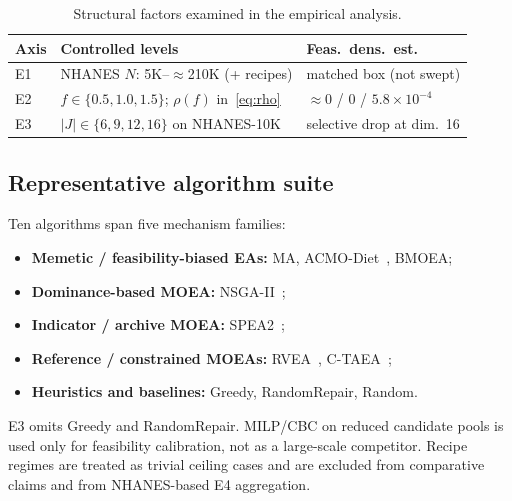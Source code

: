 \documentclass[lettersize,journal]{IEEEtran}
\begin{document}
\begin{table}[!t]
\centering
\caption{Structural factors examined in the empirical analysis.}
\label{tab:axes}
\scriptsize
\setlength{\tabcolsep}{2.5pt}
\begin{tabular}{@{}p{0.8cm}p{3.5cm}p{2.5cm}@{}}
\toprule
Axis & Controlled levels & Feas.\ dens.\ est. \\
\midrule
E1 & NHANES $N$: 5K--$\approx$210K (+ recipes) & matched box (not swept) \\
E2 & $f\in\{0.5,1.0,1.5\}$; $\rho(f)$ in~\eqref{eq:rho} & $\approx0$ / $0$ / $5.8{\times}10^{-4}$ \\
E3 & $|J|\in\{6,9,12,16\}$ on NHANES-10K & selective drop at dim.\ 16 \\
\bottomrule
\end{tabular}
\end{table}

\subsection{Representative algorithm suite}
Ten algorithms span five mechanism families:
\begin{itemize}
\item \textbf{Memetic / feasibility-biased EAs:} MA, ACMO-Diet~\cite{zhao2025acmodiet}, BMOEA;
\item \textbf{Dominance-based MOEA:} NSGA-II~\cite{deb2002};
\item \textbf{Indicator / archive MOEA:} SPEA2~\cite{zitzler2001};
\item \textbf{Reference / constrained MOEAs:} RVEA~\cite{cheng2016}, C-TAEA~\cite{li2019ctaea};
\item \textbf{Heuristics and baselines:} Greedy, RandomRepair, Random.
\end{itemize}
E3 omits Greedy and RandomRepair.
MILP/CBC on reduced candidate pools is used only for feasibility calibration, not as a large-scale competitor.
Recipe regimes are treated as trivial ceiling cases and are excluded from comparative claims and from NHANES-based E4 aggregation.
\end{document}
